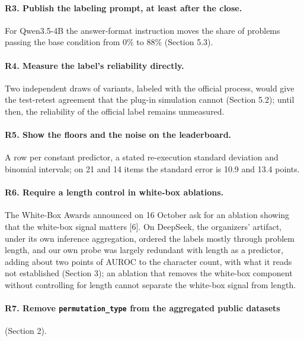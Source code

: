 \paragraph{R3. Publish the labeling prompt, at least after the close.}
For Qwen3.5-4B the answer-format instruction moves the share of problems passing the base condition from 0\% to 88\% (Section 5.3).

\paragraph{R4. Measure the label's reliability directly.}
Two independent draws of variants, labeled with the official process, would give the test-retest agreement that the plug-in simulation cannot (Section 5.2); until then, the reliability of the official label remains unmeasured.

\paragraph{R5. Show the floors and the noise on the leaderboard.}
A row per constant predictor, a stated re-execution standard deviation and binomial intervals; on 21 and 14 items the standard error is 10.9 and 13.4 points.

\paragraph{R6. Require a length control in white-box ablations.}
The White-Box Awards announced on 16 October ask for an ablation showing that the white-box signal matters [6]. On DeepSeek, the organizers' artifact, under its own inference aggregation, ordered the labels mostly through problem length, and our own probe was largely redundant with length as a predictor, adding about two points of AUROC to the character count, with what it reads not established (Section 3); an ablation that removes the white-box component without controlling for length cannot separate the white-box signal from length.

\paragraph{R7. Remove \texttt{permutation\_type} from the aggregated public datasets}
(Section 2).
